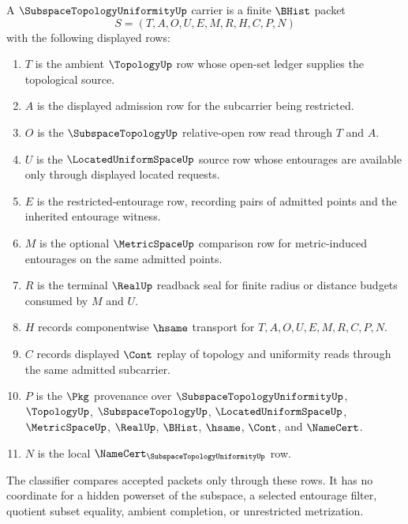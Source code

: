 \begin{definition}
\label{def:subspace-topology-uniformity-carrier}
A $\SubspaceTopologyUniformityUp$ carrier is a finite $\BHist$ packet
$$
S=(T,A,O,U,E,M,R,H,C,P,N)
$$
with the following displayed rows:
\begin{enumerate}
\item $T$ is the ambient $\TopologyUp$ row whose open-set ledger supplies the topological source.
\item $A$ is the displayed admission row for the subcarrier being restricted.
\item $O$ is the $\SubspaceTopologyUp$ relative-open row read through $T$ and $A$.
\item $U$ is the $\LocatedUniformSpaceUp$ source row whose entourages are available only through displayed located requests.
\item $E$ is the restricted-entourage row, recording pairs of admitted points and the inherited entourage witness.
\item $M$ is the optional $\MetricSpaceUp$ comparison row for metric-induced entourages on the same admitted points.
\item $R$ is the terminal $\RealUp$ readback seal for finite radius or distance budgets consumed by $M$ and $U$.
\item $H$ records componentwise $\hsame$ transport for $T,A,O,U,E,M,R,C,P,N$.
\item $C$ records displayed $\Cont$ replay of topology and uniformity reads through the same admitted subcarrier.
\item $P$ is the $\Pkg$ provenance over $\SubspaceTopologyUniformityUp$, $\TopologyUp$, $\SubspaceTopologyUp$, $\LocatedUniformSpaceUp$, $\MetricSpaceUp$, $\RealUp$, $\BHist$, $\hsame$, $\Cont$, and $\NameCert$.
\item $N$ is the local $\NameCert_{\SubspaceTopologyUniformityUp}$ row.
\end{enumerate}
The classifier compares accepted packets only through these rows. It has no coordinate for a hidden powerset of the subspace, a selected entourage filter, quotient subset equality, ambient completion, or unrestricted metrization.
\end{definition}

